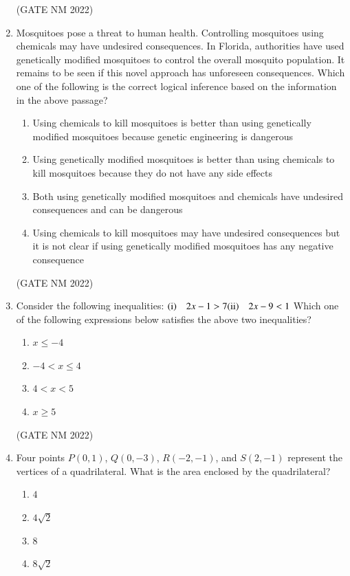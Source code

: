 \documentclass[journal,12pt,onecolumn]{IEEEtran}
\theoremstyle{remark}
\begin{document}
\begin{enumerate}
\hfill(GATE NM 2022)

\item  Mosquitoes pose a threat to human health. Controlling mosquitoes using chemicals may have undesired consequences. In Florida, authorities have used genetically modified mosquitoes to control the overall mosquito population. It remains to be seen if this novel approach has unforeseen consequences.  
Which one of the following is the correct logical inference based on the information in the above passage?  
\begin{enumerate}
    \item Using chemicals to kill mosquitoes is better than using genetically modified mosquitoes because genetic engineering is dangerous
    \item Using genetically modified mosquitoes is better than using chemicals to kill mosquitoes because they do not have any side effects
    \item Both using genetically modified mosquitoes and chemicals have undesired consequences and can be dangerous
    \item Using chemicals to kill mosquitoes may have undesired consequences but it is not clear if using genetically modified mosquitoes has any negative consequence
\end{enumerate}

\hfill(GATE NM 2022)

\item  Consider the following inequalities:  	
   $ \text{(i)} \quad   2x - 1 > 7 \\
 \text{(ii)} \quad   2x - 9 < 1$
Which one of the following expressions below satisfies the above two inequalities? 
\begin{multicols}{2}
\begin{enumerate}
    \item $x \leq -4$
    \item $-4 < x \leq 4$
    \item $4 < x < 5$
    \item $x \geq 5$
\end{enumerate}
\end{multicols}

\hfill(GATE NM 2022)

\item  Four points $P(0, 1)$, $Q(0, -3)$, $R(-2, -1)$, and $S(2, -1)$ represent the vertices of a quadrilateral.  
What is the area enclosed by the quadrilateral? 
\begin{multicols}{4}
\begin{enumerate}
    \item $4$
    \item $4\sqrt{2}$
    \item $8$
    \item $8\sqrt{2}$
\end{enumerate}
\end{multicols}


\end{enumerate}
\end{document}
